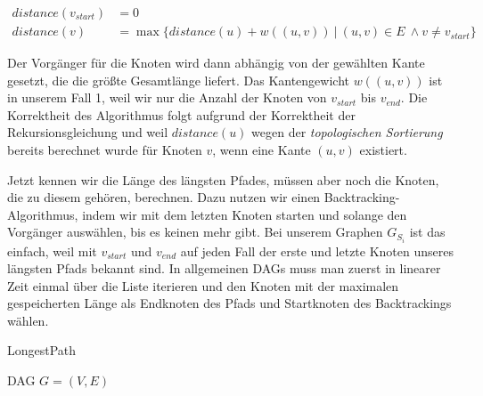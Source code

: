 \begin{equation}
\begin{split}
	distance(v_{start}) & = 0 \\
	distance(v)       & = \max\{distance(u) + w((u,v))\:|\:(u,v) \in E\ \wedge v \neq v_{start}\} 
\end{split}
\end{equation} 

Der Vorgänger für die Knoten wird dann abhängig von der gewählten Kante gesetzt, die die größte Gesamtlänge liefert. Das Kantengewicht $w((u,v))$ ist in unserem Fall 1, weil wir nur die Anzahl der Knoten von $v_{start}$ bis $v_{end}$. Die Korrektheit des Algorithmus folgt aufgrund der Korrektheit der Rekursionsgleichung und weil $distance(u)$ wegen der \emph{topologischen Sortierung} bereits berechnet wurde für Knoten $v$, wenn eine Kante $(u,v)$ existiert.

Jetzt kennen wir die Länge des längsten Pfades, müssen aber noch die Knoten, die zu diesem gehören, berechnen. Dazu nutzen wir einen Backtracking-Algorithmus, indem wir mit dem letzten Knoten starten und solange den Vorgänger auswählen, bis es keinen mehr gibt. Bei unserem Graphen $G_{S_i}$ ist das einfach, weil mit $v_{start}$ und $v_{end}$ auf jeden Fall der erste und letzte Knoten unseres längsten Pfads bekannt sind. In allgemeinen DAGs muss man zuerst in linearer Zeit einmal über die Liste iterieren und den Knoten mit der maximalen gespeicherten Länge als Endknoten des Pfads und Startknoten des Backtrackings wählen.

\begin{algorithm}
	\caption{LongestPath}
	\label{alg:longestpath}
	\begin{algorithmic}[1]
		\Require DAG $G = (V,E)$
			 
			\EndWhile
			 
			 
			\EndWhile
		\EndProcedure
	\end{algorithmic}
\end{algorithm}

